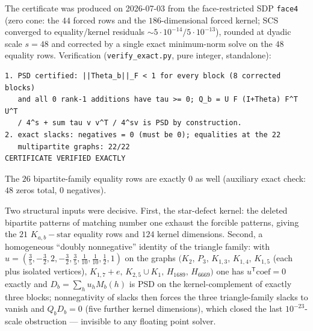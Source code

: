 \documentclass[11pt]{amsart}
\begin{document}
The certificate was produced on 2026-07-03 from the face-restricted SDP
\texttt{face4} (zero cone: the $44$ forced rows and the $186$-dimensional
forced kernel; SCS converged to equality/kernel residuals
$\sim5\cdot10^{-14}/5\cdot10^{-13}$), rounded at dyadic scale $s=48$ and
corrected by a single exact minimum-norm solve on the $48$ equality rows.
Verification (\texttt{verify\_exact.py}, pure integer, standalone):

\begin{verbatim}
1. PSD certified: ||Theta_b||_F < 1 for every block (8 corrected blocks)
   and all 0 rank-1 additions have tau >= 0; Q_b = U F (I+Theta) F^T U^T
   / 4^s + sum tau v v^T / 4^sv is PSD by construction.
2. exact slacks: negatives = 0 (must be 0); equalities at the 22
   multipartite graphs: 22/22
CERTIFICATE VERIFIED EXACTLY
\end{verbatim}

The $26$ bipartite-family equality rows are exactly $0$ as well
(auxiliary exact check: $48$ zeros total, $0$ negatives).

Two structural inputs were decisive.  First, the star-defect kernel:
the deleted bipartite patterns of matching number one exhaust the forcible
patterns, giving the $21$ $K_{a,b}-\mathrm{star}$ equality rows and $124$
kernel dimensions.  Second, a homogeneous ``doubly nonnegative'' identity
of the triangle family: with
$u = (\tfrac35,-\tfrac32,2,-\tfrac32,\tfrac35,\tfrac1{10},\tfrac1{10},
\tfrac12,1)$ on the graphs $(K_2,\,P_3,\,K_{1,3},\,K_{1,4},\,K_{1,5}$ (each
plus isolated vertices)$,\,K_{1,7}{+}e,\,K_{2,5}\cup K_1,\,H_{1689},\,
H_{6669})$ one has $u^{\mathsf T}\mathrm{coef}=0$ exactly and
$D_b=\sum_h u_h M_b(h)$ is PSD on the kernel-complement of exactly three
blocks; nonnegativity of slacks then forces the three triangle-family
slacks to vanish and $Q_b D_b=0$ (five further kernel dimensions), which
closed the last $10^{-23}$-scale obstruction --- invisible to any floating
point solver.
\end{document}
